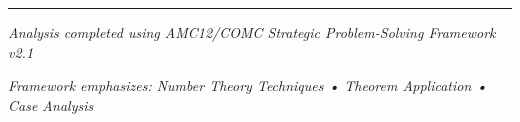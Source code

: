 \documentclass[12pt]{article}
\begin{document}
\vspace{2em}

\hrule

\vspace{1em}

\begin{center}
\textit{Analysis completed using AMC12/COMC Strategic Problem-Solving Framework v2.1}

\textit{Framework emphasizes: Number Theory Techniques • Theorem Application • Case Analysis}
\end{center}
\end{document}
